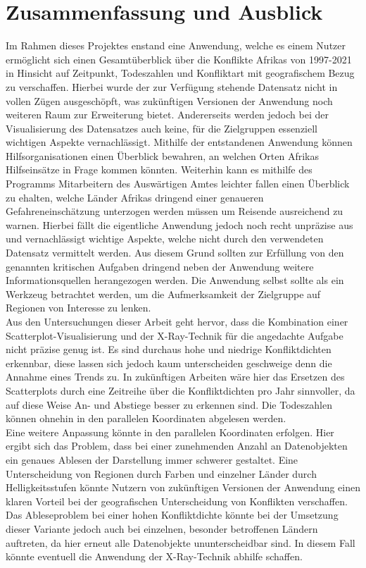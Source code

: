 \documentclass[usegeometry=true]{scrartcl}
\begin{document}
\section{Zusammenfassung und Ausblick}
Im Rahmen dieses Projektes enstand eine Anwendung, welche es einem Nutzer ermöglicht sich einen Gesamtüberblick über die Konflikte Afrikas von 1997-2021 in Hinsicht auf Zeitpunkt, Todeszahlen und Konfliktart mit geografischem Bezug zu verschaffen. Hierbei wurde der zur Verfügung stehende Datensatz nicht in vollen Zügen ausgeschöpft, was zukünftigen Versionen der Anwendung noch weiteren Raum zur Erweiterung bietet. Andererseits werden jedoch bei der Visualisierung des Datensatzes auch keine, für die Zielgruppen essenziell wichtigen Aspekte vernachlässigt. Mithilfe der entstandenen Anwendung können Hilfsorganisationen einen Überblick bewahren, an welchen Orten Afrikas Hilfseinsätze in Frage kommen könnten. Weiterhin kann es mithilfe des Programms Mitarbeitern des Auswärtigen Amtes leichter fallen einen Überblick zu ehalten, welche Länder Afrikas dringend einer genaueren Gefahreneinschätzung unterzogen werden müssen um Reisende ausreichend zu warnen. Hierbei fällt die eigentliche Anwendung jedoch noch recht unpräzise aus und vernachlässigt wichtige Aspekte, welche nicht durch den verwendeten Datensatz vermittelt werden. Aus diesem Grund sollten zur Erfüllung von den genannten kritischen Aufgaben dringend neben der Anwendung weitere Informationsquellen herangezogen werden. Die Anwendung selbst sollte als ein Werkzeug betrachtet werden, um die Aufmerksamkeit der Zielgruppe auf Regionen von Interesse zu lenken.\\

Aus den Untersuchungen dieser Arbeit geht hervor, dass die Kombination einer Scatterplot-Visualisierung und der X-Ray-Technik für die angedachte Aufgabe nicht präzise genug ist. Es sind durchaus hohe und niedrige Konfliktdichten erkennbar, diese lassen sich jedoch kaum unterscheiden geschweige denn die Annahme eines Trends zu. In zukünftigen Arbeiten wäre hier das Ersetzen des Scatterplots durch eine Zeitreihe über die Konfliktdichten pro Jahr sinnvoller, da auf diese Weise An- und Abstiege besser zu erkennen sind. Die Todeszahlen können ohnehin in den parallelen Koordinaten abgelesen werden.\\

Eine weitere Anpassung könnte in den parallelen Koordinaten erfolgen. Hier ergibt sich das Problem, dass bei einer zunehmenden Anzahl an Datenobjekten ein genaues Ablesen der Darstellung immer schwerer gestaltet. Eine Unterscheidung von Regionen durch Farben und einzelner Länder durch Helligkeitsstufen könnte Nutzern von zukünftigen Versionen der Anwendung einen klaren Vorteil bei der geografischen Unterscheidung von Konflikten verschaffen. Das Ableseproblem bei einer hohen Konfliktdichte könnte bei der Umsetzung dieser Variante jedoch auch bei einzelnen, besonder betroffenen Ländern auftreten, da hier erneut alle Datenobjekte ununterscheidbar sind. In diesem Fall könnte eventuell die Anwendung der X-Ray-Technik abhilfe schaffen.\\
\end{document}
